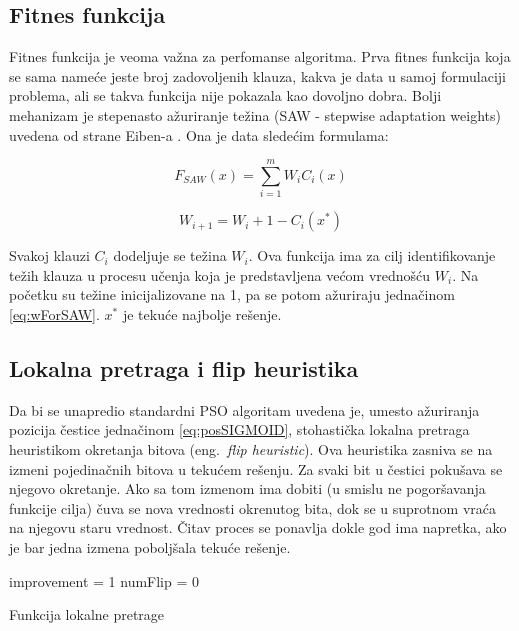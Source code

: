 \documentclass{article}
\begin{document}
\subsection{Fitnes funkcija}
\label{sec:pso_fitness}
Fitnes funkcija je veoma važna za perfomanse algoritma.
Prva fitnes funkcija koja se sama nameće jeste broj zadovoljenih klauza, kakva je data u samoj formulaciji problema, ali se takva funkcija nije pokazala kao dovoljno dobra. Bolji mehanizam je stepenasto ažuriranje težina (SAW - stepwise adaptation weights) uvedena od strane Eiben-a \cite{fitnes}. Ona je data sledećim formulama:

\begin{equation}\label{eq:SAW}
F_{SAW}(x) = \sum_{i=1}^{m} W_iC_i(x)
\end{equation}

\begin{equation}\label{eq:wForSAW}
W_{i+1} = W_{i} + 1 - C_i(x^*)
\end{equation}

Svakoj klauzi $C_i$ dodeljuje se težina $W_i$. Ova funkcija ima za cilj identifikovanje težih klauza u procesu učenja koja je predstavljena većom vrednošću $W_i$. Na početku su težine inicijalizovane na 1, pa se potom ažuriraju jednačinom \ref{eq:wForSAW}. $x^*$ je tekuće najbolje rešenje.


\subsection{Lokalna pretraga i flip heuristika}
\label{sec:pso_lokalna_pretraga_flip}

Da bi se unapredio standardni PSO algoritam uvedena je, umesto ažuriranja pozicija čestice jednačinom \ref{eq:posSIGMOID}, stohastička lokalna pretraga heuristikom okretanja bitova (eng.~{\em flip heuristic}).
Ova heuristika zasniva se na izmeni pojedinačnih bitova u tekućem rešenju. Za svaki bit u čestici pokušava se njegovo okretanje. Ako sa tom izmenom ima dobiti (u smislu ne pogoršavanja funkcije cilja) čuva se nova vrednosti okrenutog bita, dok se u suprotnom vraća na njegovu staru vrednost. 
Čitav proces se ponavlja dokle god ima napretka, ako je bar jedna izmena poboljšala tekuće rešenje.


\begin{algorithm}[H]
\SetAlgoLined
{}

\BlankLine
 improvement = 1\;
 numFlip = 0\;
 \caption{Funkcija lokalne pretrage}
\end{algorithm}
\end{document}
